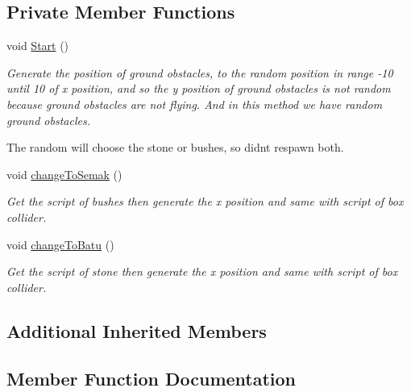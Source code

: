 \subsection*{Private Member Functions}
\begin{DoxyCompactItemize}
\item 
void \hyperlink{class_ground_obstacle_controller_ac03d4b2a3dc70e560a8ffa100035400e}{Start} ()
\begin{DoxyCompactList}\small\item\em Generate the position of ground obstacles, to the random position in range -\/10 until 10 of x position, and so the y position of ground obstacles is not random because ground obstacles are not flying. And in this method we have random ground obstacles. 

The random will choose the stone or bushes, so didn\textquotesingle{}t respawn both.\end{DoxyCompactList}\item 
void \hyperlink{class_ground_obstacle_controller_a755e906f0dd101886ad14b20dabbe89e}{change\+To\+Semak} ()
\begin{DoxyCompactList}\small\item\em Get the script of bushes then generate the x position and same with script of box collider. \end{DoxyCompactList}\item 
void \hyperlink{class_ground_obstacle_controller_a975b0dba0ed0ee928ad1b7cd40db98da}{change\+To\+Batu} ()
\begin{DoxyCompactList}\small\item\em Get the script of stone then generate the x position and same with script of box collider. \end{DoxyCompactList}\end{DoxyCompactItemize}
\subsection*{Additional Inherited Members}


\subsection{Member Function Documentation}
\hypertarget{class_ground_obstacle_controller_a975b0dba0ed0ee928ad1b7cd40db98da}{}\label{class_ground_obstacle_controller_a975b0dba0ed0ee928ad1b7cd40db98da} 
